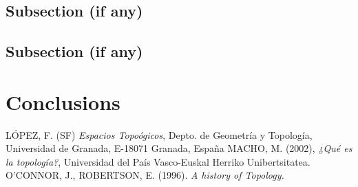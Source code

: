 \documentclass[12pt, twoside]{article}
\begin{document}
\subsection{Subsection (if any)}
\lipsum %
\subsection{Subsection (if any)}
\lipsum %

\newpage
\section{Conclusions}
\lipsum[5] %
\lipsum[1] %

\newpage

\begin{thebibliography}{X} %
 LÓPEZ, F. (SF) \textit{Espacios Topoógicos}, Depto. de Geometría y Topología, Universidad de Granada, E-18071 Granada, España
 MACHO, M. (2002), \textit{¿Qué es la topología?}, Universidad del País Vasco-Euskal Herriko Unibertsitatea.
 O’CONNOR, J., ROBERTSON, E. (1996). \textit{A history of Topology.}
\end{thebibliography}
\end{document}
